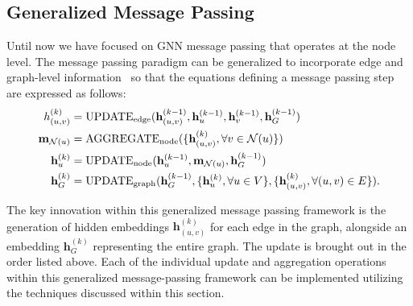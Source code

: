 \subsection{Generalized Message Passing}
Until now we have focused on GNN message passing that operates at the node level. The message passing paradigm can be generalized to incorporate edge and graph-level information~\cite{battaglia2018relationalInductiveBiases} so that the equations defining a message passing step are expressed as follows:
\begin{align*}
\label\mathbf{h}^{(k)}_{(u,v)} &= \text{UPDATE}_\text{edge}(\mathbf{h}^{(k-1)}_{(u,v)}, \mathbf{h}^{(k-1)}_u, \mathbf{h}^{(k-1)}_v, \mathbf{h}^{(k-1)}_G)\\
\mathbf{m}_{\mathcal{N}(u)} &= \text{AGGREGATE}_\text{node}(\{\mathbf{h}^{(k)}_{(u,v)}, \forall v \in \mathcal{N}(u)\})\\
\mathbf{h}^{(k)}_u &= \text{UPDATE}_\text{node}(\mathbf{h}^{(k-1)}_u, \mathbf{m}_{\mathcal{N}(u)}, \mathbf{h}^{(k-1)}_G)\\
\mathbf{h}^{(k)}_G &= \text{UPDATE}_\text{graph}(\mathbf{h}^{(k-1)}_G, \{\mathbf{h}^{(k)}_u, \forall u \in V\}, \{\mathbf{h}^{(k)}_{(u,v)}, \forall (u,v) \in E\}).
\end{align*}

The key innovation within this generalized message passing framework is the generation of hidden embeddings $ \mathbf{h}^{(k)}_{(u,v)} $ for each edge in the graph, alongside an embedding $ \mathbf{h}^{(k)}_G $ representing the entire graph. 
The update is brought out in the order listed above. Each of the individual update and aggregation operations within this generalized message-passing framework can be implemented utilizing the techniques discussed within this section.